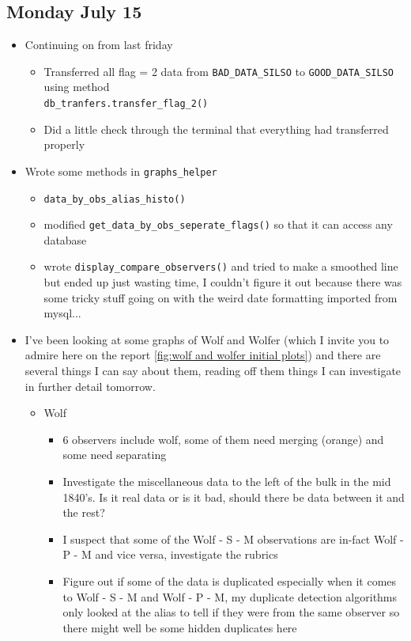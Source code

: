 \documentclass[12pt]{article}
\begin{document}
\subsection{Monday July 15}
\begin{itemize}
    \item Continuing on from last friday
    \begin{itemize}
        \item Transferred all flag = 2 data from \texttt{BAD\_DATA\_SILSO} to \texttt{GOOD\_DATA\_SILSO} using method \\\texttt{db\_tranfers.transfer\_flag\_2()}
        \item Did a little check through the terminal that everything had transferred properly
    \end{itemize}
    \item Wrote some methods in \texttt{graphs\_helper}
    \begin{itemize}
        \item \texttt{data\_by\_obs\_alias\_histo()}
        \item modified \texttt{get\_data\_by\_obs\_seperate\_flags()} so that it can access any database
        \item wrote \texttt{display\_compare\_observers()} and tried to make a smoothed line but ended up just wasting time, I couldn't figure it out because there was some tricky stuff going on with the weird date formatting imported from mysql...
    \end{itemize}
    \item I've been looking at some graphs of Wolf and Wolfer (which I invite you to admire here on the report \ref{fig:wolf and wolfer initial plots}) and there are several things I can say about them, reading off them things I can investigate in further detail tomorrow.
    \begin{itemize}
        \item Wolf
        \begin{itemize}
            \item 6 observers include wolf, some of them need merging (orange) and some need separating
            \item Investigate the miscellaneous data to the left of the bulk in the mid 1840's. Is it real data or is it bad, should there be data between it and the rest?
            \item I suspect that some of the Wolf - S - M observations are in-fact Wolf - P - M and vice versa, investigate the rubrics
            \item Figure out if some of the data is duplicated especially when it comes to Wolf - S - M and Wolf - P - M, my duplicate detection algorithms only looked at the alias to tell if they were from the same observer so there might well be some hidden duplicates here

\end{itemize}
\end{itemize}
\end{itemize}
\end{document}
